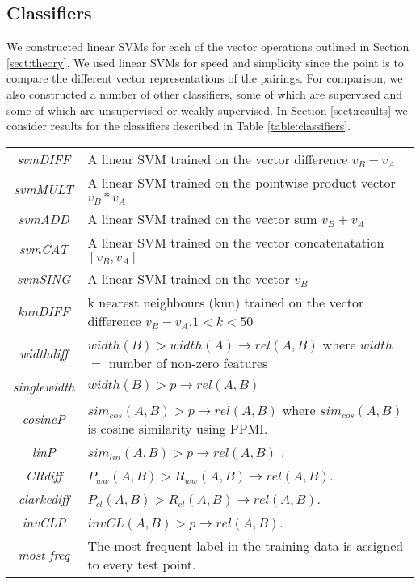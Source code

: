 \documentclass[11pt]{article}
\begin{document}
\subsection{Classifiers}

We constructed linear SVMs for each of the vector operations outlined in Section \ref{sect:theory}.  We used linear SVMs for speed and simplicity since the point is to compare the different vector representations of the pairings.  For comparison, we also constructed a number of other classifiers, some of which are supervised and some of which are unsupervised or weakly supervised.  In Section \ref{sect:results} we consider results for the classifiers described in Table \ref{table:classifiers}.

\begin{table*}[ht]
\centering
\begin{tabular}{|c|p{14cm}|}
\hline
\emph{svmDIFF}& A linear SVM trained on the vector difference $v_B - v_A$\\
\emph{svmMULT}& A linear SVM trained on the pointwise product vector $v_B * v_A$\\
\emph{svmADD}& A linear SVM trained on the vector sum $v_B + v_A$\\
\emph{svmCAT}& A linear SVM trained on the vector concatenatation $[v_B,v_A]$\\
\emph{svmSING}& A linear SVM trained on the vector $v_B$\\
\emph{knnDIFF}& k nearest neighbours (knn) trained on the vector difference $v_B - v_A$.$1< k<50$\\
\hline
\emph{widthdiff}& $width(B) > width(A) \rightarrow rel(A,B)$  where $width$ $=$ number of non-zero features\\
\emph{singlewidth}& $width(B) > p \rightarrow rel(A,B)$\\
\emph{cosineP}& $sim_{cos}(A,B) > p \rightarrow rel(A,B)$ where $sim_{cos}(A,B)$ is cosine similarity using PPMI.\\
\emph{linP}&$sim_{lin}(A,B) > p \rightarrow rel(A,B)$ \cite{Lin1998}.\\
\emph{CRdiff}& $P_{ww}(A,B) > R_{ww}(A,B) \rightarrow rel(A,B)$.  \cite{Weeds2004}\\
\emph{clarkediff}&$P_{cl}(A,B) > R_{cl}(A,B) \rightarrow rel(A,B)$.  \cite{Clarke2007}\\
\emph{invCLP}&$ invCL(A,B) > p \rightarrow rel(A,B)$.  \cite{Lenci2012}\\
\emph{most freq}&The most frequent label in the training data is assigned to every test point.\\
\hline
\end{tabular}
\caption{Implemented classifiers}
\label{table:classifiers}
\end{table*}
\end{document}
